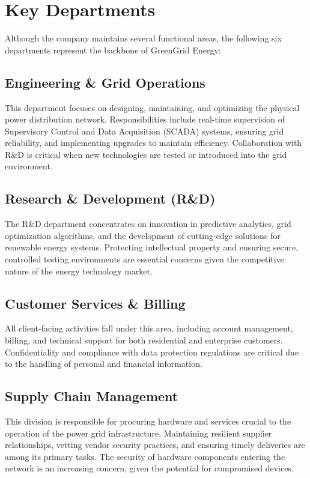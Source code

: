 \section{Key Departments}
Although the company maintains several functional areas, the following six departments represent the backbone of GreenGrid Energy:

\subsection{Engineering \& Grid Operations}
This department focuses on designing, maintaining, and optimizing the physical power distribution network. Responsibilities include real-time supervision of Supervisory Control and Data Acquisition (SCADA) systems, ensuring grid reliability, and implementing upgrades to maintain efficiency. Collaboration with R\&D is critical when new technologies are tested or introduced into the grid environment.

\subsection{Research \& Development (R\&D)}
The R\&D department concentrates on innovation in predictive analytics, grid optimization algorithms, and the development of cutting-edge solutions for renewable energy systems. Protecting intellectual property and ensuring secure, controlled testing environments are essential concerns given the competitive nature of the energy technology market.

\subsection{Customer Services \& Billing}
All client-facing activities fall under this area, including account management, billing, and technical support for both residential and enterprise customers. Confidentiality and compliance with data protection regulations are critical due to the handling of personal and financial information.

\subsection{Supply Chain Management}
This division is responsible for procuring hardware and services crucial to the operation of the power grid infrastructure. Maintaining resilient supplier relationships, vetting vendor security practices, and ensuring timely deliveries are among its primary tasks. The security of hardware components entering the network is an increasing concern, given the potential for compromised devices.

